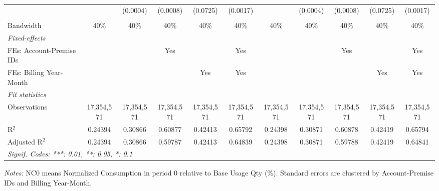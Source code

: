 \begin{table}[htbp]
\begin{adjustbox}{scale = 0.7}
\begin{tabular}{lcccccccccc}
  &   & (0.0004) & (0.0008) & (0.0725) & (0.0017) &    & (0.0004) & (0.0008) & (0.0725) & (0.0017)\\
&   &   &   &   &   &   &   &   &   &  \\
\midrule Bandwidth & 40\% & 40\% & 40\% & 40\% & 40\% & 40\% & 40\% & 40\% & 40\% & 40\%\\
\midrule
\emph{Fixed-effects}&   &   &   &   &   &   &   &   &   &  \\
FEs: Account-Premise IDs &  &  & Yes &  & Yes &  &  & Yes &  & Yes\\
FEs: Billing Year-Month &  &  &  & Yes & Yes &  &  &  & Yes & Yes\\
\midrule
\emph{Fit statistics}&  & & & & & & & & & \\
Observations & 17,354,571&17,354,571&17,354,571&17,354,571&17,354,571&17,354,571&17,354,571&17,354,571&17,354,571&17,354,571\\
R$^2$ & 0.24394&0.30866&0.60877&0.42413&0.65792&0.24398&0.30871&0.60878&0.42419&0.65794\\
Adjusted R$^2$ & 0.24394&0.30866&0.59787&0.42413&0.64839&0.24398&0.30871&0.59788&0.42419&0.64841\\
\bottomrule\bottomrule
\multicolumn{11}{l}{\emph{Signif. Codes: ***: 0.01, **: 0.05, *: 0.1}}\\
\end{tabular}
\end{adjustbox}
\begin{tablenotes}
\footnotesize
\emph{\medskip Notes:} NC0 means Normalized Consumption in period 0 relative to Base Usage Qty (\%). Standard errors are clustered by Account-Premise IDs and Billing Year-Month.
\end{tablenotes}
\end{table}